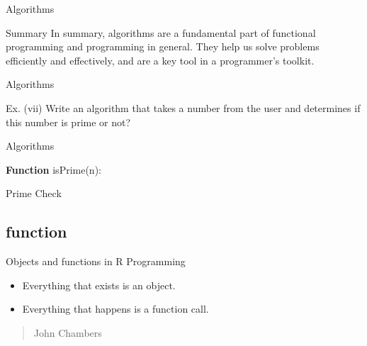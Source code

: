 \documentclass{beamer}\usepackage[]{graphicx}\usepackage[]{xcolor}
\begin{document}
\begin{frame}{Algorithms}
\begin{alertblock}{Summary}
    In summary, algorithms are a fundamental part of functional programming and programming in general. They help us solve problems efficiently and effectively, and are a key tool in a programmer's toolkit.

\end{alertblock}
\end{frame}

\begin{frame}{Algorithms}
\begin{exampleblock}{Ex. (vii)}
    Write an algorithm that takes a number from the user and determines if this number is prime or not?
\end{exampleblock}
\end{frame}


\begin{frame}{Algorithms}
    \begin{algorithm}[H]
        \SetAlgoLined
         \textbf{Function} isPrime(n):\\
         \caption{Prime Check}
        \end{algorithm}
\end{frame}


\subsection{function}
\begin{frame}
\begin{alertblock}{Objects and functions in R Programming}
    \begin{itemize}
        \item Everything that exists is an object.
        \item Everything that happens is a function call.
    \end{itemize}
    \begin{quote}
        John Chambers
    \end{quote}
\end{alertblock}
\end{frame}
\end{document}

